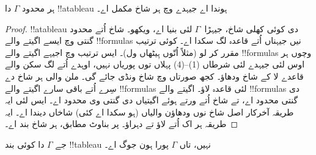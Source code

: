 \documentclass[../../../include/open-logic-section]{subfiles}
\begin{document}
\begin{prop}
  ہر محدود $\Gamma$ دا !!a{tableau} ہوندا اے جیہدے وچ ہر شاخ مکمل اے۔
\end{prop}

\begin{proof}
  !!a{tableau} دی کوئی کھلی شاخ، جیہڑا~$\Gamma$ لئی بنیا اے، ویکھو۔ شاخ اُتے محدود
  گنتی وچ ایسے اگیتے والے !!{formula}s نیں جیہناں اُتے قاعدہ لگ سکدا
  اے۔ کوئی ترتیب مقرر کر لو (مثلاً اُتّوں ہِیٹھاں ول)۔ ایس ترتیب وچ
  اجیہے اگیتے والے !!{formula}s وچوں ہر اوس لئی جیہدے لئی شرطاں (1)--(4) پہلاں
  توں پوریاں نہیں، اوہدے اُتے لگ سکن والے قاعدے لا کے شاخ ودھاؤ۔
  کجھ صورتاں وچ شاخ ونڈی جائے گی۔ ملن والی ہر شاخ دے سِرے اُتے
  باقی سارے اگیتے والے !!{formula}s لئی قاعدہ لاؤ۔ اگیتے والے
  !!{formula}s دی گنتی محدود اے، تے شاخ اُتے ورتے ہوئے اگیتیاں دی گنتی
  وی محدود اے۔ ایس لئی ایہ طریقہ آخرکار اصل شاخ نوں ودھاؤن والیاں
  (ہو سکدا اے کئی) شاخاں دیندا اے۔ ایہ طریقہ ہر اک اُتے لاؤ تے
  دہراؤ۔ پر بناوٹ مطابق، ہر شاخ بند اے۔
\end{proof}

\begin{thm}[تمامیت]
  جے $\Gamma$ دا کوئی بند !!{tableau} نہیں، تاں $\Gamma$ پورا ہون جوگ اے۔
\end{thm}
\end{document}
